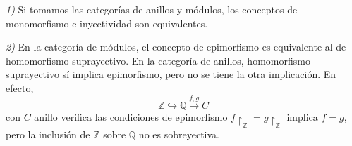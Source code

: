 \documentclass[../main.tex]{subfiles}
\begin{document}
\begin{remark}
\textit{1)} Si tomamos las categorías de anillos y módulos, los conceptos de monomorfismo e inyectividad son equivalentes.

\textit{2)} En la categoría de módulos, el concepto de epimorfismo es equivalente al de homomorfismo suprayectivo. En la categoría de anillos, homomorfismo suprayectivo sí implica epimorfismo, pero no se tiene la otra implicación. En efecto, $$\mathbb{Z}\hookrightarrow \mathbb{Q}\overset{f,g}{\longrightarrow}C$$con $C$ anillo verifica las condiciones de epimorfismo $f\restriction_{\mathbb{Z}}= g\restriction_{\mathbb{Z}}$ implica $f=g$, pero la inclusión de $\mathbb{Z}$ sobre $\mathbb{Q}$ no es sobreyectiva.
\end{remark}
\end{document}
